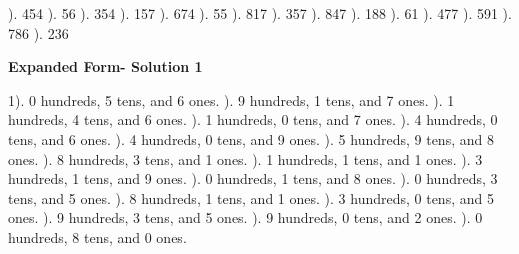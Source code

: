 \documentclass{article}%
\begin{document}
). 454%
). 56%
). 354%
). 157%
). 674%
). 55%
). 817%
). 357%
). 847%
). 188%
). 61%
). 477%
). 591%
). 786%
). 236%
\newline%
\newpage%
\large%
\begin{center}%
\textbf{Expanded Form- Solution 1}%
\newline%
\end{center} \normalsize%
1). 0 hundreds, 5 tens, and 6 ones.%
). 9 hundreds, 1 tens, and 7 ones.%
). 1 hundreds, 4 tens, and 6 ones.%
). 1 hundreds, 0 tens, and 7 ones.%
). 4 hundreds, 0 tens, and 6 ones.%
). 4 hundreds, 0 tens, and 9 ones.%
). 5 hundreds, 9 tens, and 8 ones.%
). 8 hundreds, 3 tens, and 1 ones.%
). 1 hundreds, 1 tens, and 1 ones.%
). 3 hundreds, 1 tens, and 9 ones.%
). 0 hundreds, 1 tens, and 8 ones.%
). 0 hundreds, 3 tens, and 5 ones.%
). 8 hundreds, 1 tens, and 1 ones.%
). 3 hundreds, 0 tens, and 5 ones.%
). 9 hundreds, 3 tens, and 5 ones.%
). 9 hundreds, 0 tens, and 2 ones.%
). 0 hundreds, 8 tens, and 0 ones.%
\end{document}

